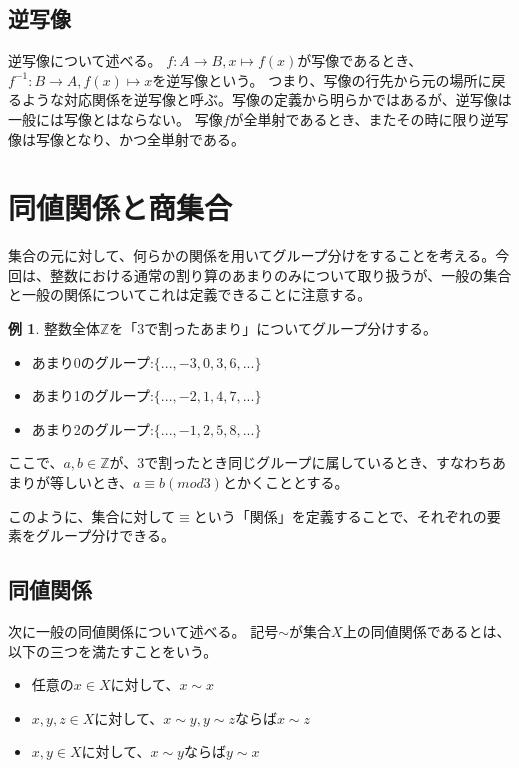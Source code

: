 \documentclass[unicode,12pt,report]{ltjsarticle}
\theoremstyle{definition}
\newtheorem{example}[definition]{例}
\begin{document}
\subsection{逆写像}
逆写像について述べる。
$f:A \to B, x \mapsto f(x)$が写像であるとき、\\
$f^{-1}: B \to A, f(x) \mapsto x$を逆写像という。
つまり、写像の行先から元の場所に戻るような対応関係を逆写像と呼ぶ。写像の定義から明らかではあるが、逆写像は一般には写像とはならない。
写像$f$が全単射であるとき、またその時に限り逆写像は写像となり、かつ全単射である。


\section{同値関係と商集合}
集合の元に対して、何らかの関係を用いてグループ分けをすることを考える。今回は、整数における通常の割り算のあまりのみについて取り扱うが、一般の集合と一般の関係についてこれは定義できることに注意する。
\begin{example}
    整数全体$\mathbb{Z}$を「$3$で割ったあまり」についてグループ分けする。
    \begin{itemize}
        \item あまり0のグループ:$\{..., -3, 0, 3, 6, ...\}$
        \item あまり1のグループ:$\{..., -2, 1, 4, 7, ...\}$
        \item あまり2のグループ:$\{..., -1, 2, 5, 8, ...\}$
    \end{itemize}
    ここで、$a, b \in \mathbb{Z}$が、$3$で割ったとき同じグループに属しているとき、すなわちあまりが等しいとき、$a \equiv b (mod 3)$とかくこととする。
\end{example}
このように、集合に対して$\equiv$という「関係」を定義することで、それぞれの要素をグループ分けできる。


\subsection{同値関係}
次に一般の同値関係について述べる。
記号$\sim $が集合$X$上の同値関係であるとは、以下の三つを満たすことをいう。
\begin{itemize}
    \item [反射律] 任意の$x \in X$に対して、$x \sim x$
    \item [推移律] $x, y, z \in X$に対して、$x \sim y,  y \sim z$ならば$x \sim z$
    \item [対称律] $x, y \in X$に対して、$x \sim y$ならば$y \sim x$
\end{itemize}
\end{document}
